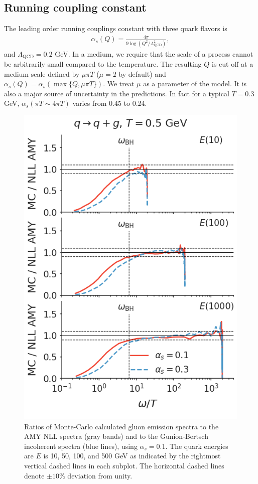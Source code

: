 \documentclass[aps, prc, reprint, amsmath, groupedaddress, nofootinbib]{revtex4-1}
\begin{document}
\begin{appendices}
\section{Running coupling constant}\label{app:alphas}
The leading order running couplings constant with three quark flavors is
\begin{eqnarray}
\alpha_s(Q) = \frac{4\pi}{9\log(Q^2/\Lambda_{\textrm{QCD}}^2)},
\end{eqnarray}
and $\Lambda_{\textrm{QCD}} = 0.2$ GeV. In a medium, we require that the scale of a process cannot be arbitrarily small compared to the temperature. The resulting $Q$ is cut off at a medium scale defined by $\mu\pi T$ ($\mu=2$ by default) and $\alpha_s(Q) = \alpha_s(\max\{Q,\mu\pi T\})$. We treat $\mu$ as a parameter of the model. It is also a major source of uncertainty in the predictions. In fact for a typical $T=0.3$ GeV, $\alpha_s(\pi T \sim 4\pi T)$ varies from 0.45 to 0.24.

\begin{figure}
\includegraphics[width=\columnwidth]{spectrum_E_q2qg.png}
\caption{Ratios of Monte-Carlo calculated gluon emission spectra to the AMY NLL spectra (gray bands) and to the Gunion-Bertsch incoherent spectra (blue lines), using $\alpha_s = 0.1$. The quark energies are $E$ is 10, 50, 100, and 500 GeV as indicated by the rightmost vertical dashed lines in each subplot. The horizontal dashed lines denote $\pm 10\%$ deviation from unity.}
\label{fig:spectra-alphas=0.1}
\end{figure}


\end{appendices}
\end{document}
